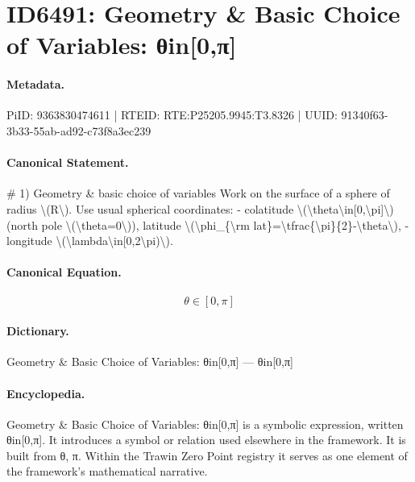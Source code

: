 \section*{ID6491: Geometry \& Basic Choice of Variables: θin[0,π]}
\paragraph{Metadata.}
PiID: 9363830474611 | RTEID: RTE:P25205.9945:T3.8326 | UUID: 91340f63-3b33-55ab-ad92-c73f8a3ec239

\paragraph{Canonical Statement.}
\# 1) Geometry \& basic choice of variables Work on the surface of a sphere of radius \textbackslash{}(R\textbackslash{}). Use usual spherical coordinates: - colatitude \textbackslash{}(\textbackslash{}theta\textbackslash{}in[0,\textbackslash{}pi]\textbackslash{}) (north pole \textbackslash{}(\textbackslash{}theta=0\textbackslash{})), latitude \textbackslash{}(\textbackslash{}phi\_\{\textbackslash{}rm lat\}=\textbackslash{}tfrac\{\textbackslash{}pi\}\{2\}-\textbackslash{}theta\textbackslash{}), - longitude \textbackslash{}(\textbackslash{}lambda\textbackslash{}in[0,2\textbackslash{}pi)\textbackslash{}).

\paragraph{Canonical Equation.}
\[
\theta\in[0,\pi]
\]

\paragraph{Dictionary.}
Geometry \& Basic Choice of Variables: θin[0,π] — θin[0,π]

\paragraph{Encyclopedia.}
Geometry \& Basic Choice of Variables: θin[0,π] is a symbolic expression, written θin[0,π]. It introduces a symbol or relation used elsewhere in the framework. It is built from θ, π. Within the Trawin Zero Point registry it serves as one element of the framework's mathematical narrative.
